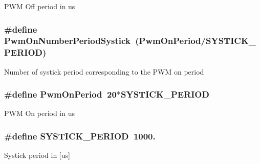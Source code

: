 P\+W\+M Off period in us \hypertarget{group__beacon_signal___macro_ga418c8710f670cbacd5b8eb429481f532}{
\subsubsection[{Pwm\+On\+Number\+Period\+Systick}]{\setlength{\rightskip}{0pt plus 5cm}\#define Pwm\+On\+Number\+Period\+Systick~({\bf Pwm\+On\+Period}/{\bf S\+Y\+S\+T\+I\+C\+K\+\_\+\+P\+E\+R\+I\+O\+D})}}\label{group__beacon_signal___macro_ga418c8710f670cbacd5b8eb429481f532}
Number of systick period corresponding to the P\+W\+M on period \hypertarget{group__beacon_signal___macro_gaa4b55d09127eed549270564a95b26827}{
\subsubsection[{Pwm\+On\+Period}]{\setlength{\rightskip}{0pt plus 5cm}\#define Pwm\+On\+Period~20$\ast${\bf S\+Y\+S\+T\+I\+C\+K\+\_\+\+P\+E\+R\+I\+O\+D}}}\label{group__beacon_signal___macro_gaa4b55d09127eed549270564a95b26827}
P\+W\+M On period in us \hypertarget{group__beacon_signal___macro_gac4be368d2c41160d8e870a97f343a526}{
\subsubsection[{S\+Y\+S\+T\+I\+C\+K\+\_\+\+P\+E\+R\+I\+O\+D}]{\setlength{\rightskip}{0pt plus 5cm}\#define S\+Y\+S\+T\+I\+C\+K\+\_\+\+P\+E\+R\+I\+O\+D~1000.}}\label{group__beacon_signal___macro_gac4be368d2c41160d8e870a97f343a526}
Systick period in \mbox{[}us\mbox{]} 